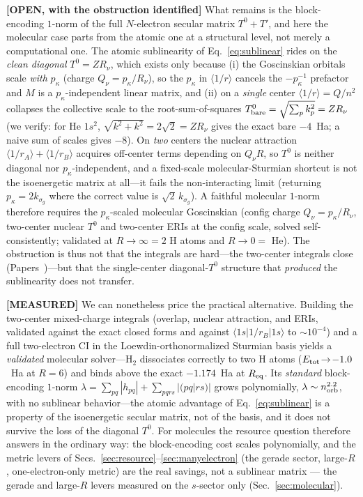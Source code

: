 \documentclass[aps,pra,twocolumn,superscriptaddress,longbibliography]{revtex4-2}
\begin{document}
\textbf{[OPEN, with the obstruction identified]} What remains is the block-encoding $1$-norm of the
full $N$-electron secular matrix $T^0+T'$, and here the molecular case parts from the atomic one at a
structural level, not merely a computational one.  The atomic sublinearity of Eq.~\eqref{eq:sublinear}
rides on the \emph{clean diagonal} $T^0=Z R_\nu$, which exists only because (i) the Goscinskian
orbitals scale \emph{with} $p_\kappa$ (charge $Q_\nu=p_\kappa/R_\nu$), so the $p_\kappa$ in
$\langle 1/r\rangle$ cancels the $-p_\kappa^{-1}$ prefactor and $M$ is a $p_\kappa$-independent linear
matrix, and (ii) on a \emph{single} center $\langle 1/r\rangle=Q/n^2$ collapses the collective scale
to the root-sum-of-squares $T^0_{\rm bare}=\sqrt{\textstyle\sum_p k_p^2}=Z R_\nu$ (we verify: for He
$1s^2$, $\sqrt{k^2+k^2}=2\sqrt2=Z R_\nu$ gives the exact bare $-4$~Ha; a naive sum of scales gives
$-8$).  On \emph{two} centers the nuclear attraction $\langle 1/r_A\rangle+\langle 1/r_B\rangle$
acquires off-center terms depending on $Q_\nu R$, so $T^0$ is neither diagonal nor $p_\kappa$-independent,
and a fixed-scale molecular-Sturmian shortcut is not the isoenergetic matrix at all---it fails the
non-interacting limit (returning $p_\kappa=2k_{\sigma_g}$ where the correct value is
$\sqrt2\,k_{\sigma_g}$).  A faithful molecular $1$-norm therefore requires the $p_\kappa$-scaled
molecular Goscinskian (config charge $Q_\nu=p_\kappa/R_\nu$, two-center nuclear $T^0$ and two-center
ERIs at the config scale, solved self-consistently; validated at $R\!\to\!\infty=2$ H atoms and
$R\!\to\!0=$ He).  The obstruction is thus not that the integrals are hard---the two-center integrals close
(Papers~\cite{loutey_paper58,loutey_paper59})---but that the single-center diagonal-$T^0$ structure
that \emph{produced} the sublinearity does not transfer.

\textbf{[MEASURED]} We can nonetheless price the practical alternative.  Building the two-center
mixed-charge integrals (overlap, nuclear attraction, and ERIs, validated against the exact closed
forms and against $\langle 1s|1/r_B|1s\rangle$ to $\sim\!10^{-4}$) and a full two-electron CI in the
Loewdin-orthonormalized Sturmian basis yields a \emph{validated} molecular solver---$\mathrm{H}_2$
dissociates correctly to two H atoms ($E_{\rm tot}\!\to\!-1.0$~Ha at $R=6$) and binds above the exact
$-1.174$~Ha at $R_{\rm eq}$.  Its \emph{standard} block-encoding $1$-norm
$\lambda=\sum_{pq}|h_{pq}|+\sum_{pqrs}|(pq|rs)|$ grows polynomially, $\lambda\sim n_{\rm orb}^{2.2}$, with
no sublinear behavior---the atomic advantage of Eq.~\eqref{eq:sublinear} is a property of the
isoenergetic secular matrix, not of the basis, and it does not survive the loss of the diagonal
$T^0$.  For molecules the resource question therefore answers in the ordinary way: the block-encoding
cost scales polynomially, and the metric levers of Secs.~\ref{sec:resource}--\ref{sec:manyelectron}
(the gerade sector, large-$R$, one-electron-only metric) are the real savings, not a sublinear
matrix --- the gerade and large-$R$ levers measured on the $s$-sector only (Sec.~\ref{sec:molecular}).
\end{document}

